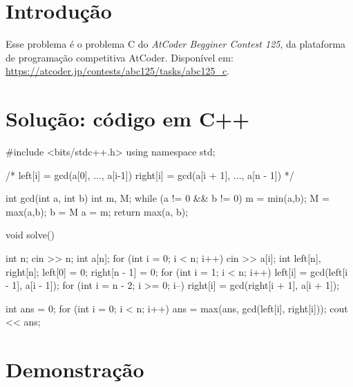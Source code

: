 \documentclass{article}
\begin{document}
\section{Introdução}
Esse problema é o problema C do \emph{AtCoder Begginer Contest 125}, da plataforma de programação competitiva AtCoder. Disponível em: \url{https://atcoder.jp/contests/abc125/tasks/abc125_c}.

\section{Solução: código em C++}\label{code-section}

\begin{code}[C++]
#include <bits/stdc++.h>
using namespace std;
    
/*
left[i] = gcd(a[0], ..., a[i-1])
right[i] = gcd(a[i + 1], ..., a[n - 1])
*/
    
int gcd(int a, int b){
    int m, M;
    while (a != 0 && b != 0){
        m = min(a,b); 
        M = max(a,b);
            b = M %
            a = m;
    }
        return max(a, b);
}
    
void solve(){
    int n;
    cin >> n;
    int a[n];
    for (int i = 0; i < n; i++){
        cin >> a[i];
    }
    int left[n], right[n];
    left[0] = 0; right[n - 1] = 0;
    for (int i = 1; i < n; i++){
        left[i] = gcd(left[i - 1], a[i - 1]);
    }
    for (int i = n - 2; i >= 0; i--){
        right[i] = gcd(right[i + 1], a[i + 1]);
    }
    
    int ans = 0;
    for (int i = 0; i < n; i++){
        ans = max(ans, gcd(left[i], right[i]));
    }
    cout << ans;
}
\end{code}

\section{Demonstração}
\end{document}
